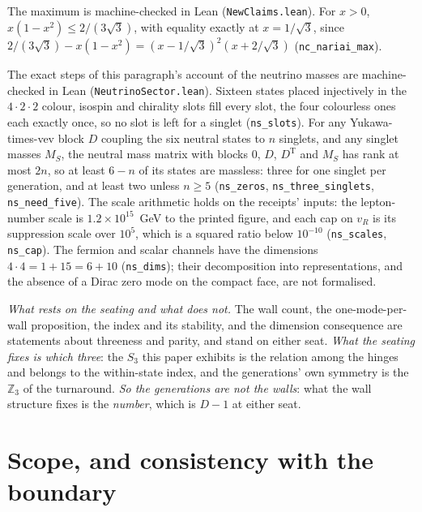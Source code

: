 \documentclass[11pt]{article}
\begin{document}
The maximum is machine-checked in Lean (\texttt{NewClaims.lean}). For $x>0$, $x(1-x^{2})\le2/(3\sqrt3)$, with equality exactly at $x=1/\sqrt3$, since $2/(3\sqrt3)-x(1-x^{2})=(x-1/\sqrt3)^{2}(x+2/\sqrt3)$ (\texttt{nc\_nariai\_max}).

The exact steps of this paragraph's account of the neutrino masses are machine-checked in Lean (\texttt{NeutrinoSector.lean}). Sixteen states placed injectively in the $4\cdot2\cdot2$ colour, isospin and chirality slots fill every slot, the four colourless ones each exactly once, so no slot is left for a singlet (\texttt{ns\_slots}). For any Yukawa-times-vev block $D$ coupling the six neutral states to $n$ singlets, and any singlet masses $M_S$, the neutral mass matrix with blocks $0$, $D$, $D^{\mathrm{T}}$ and $M_S$ has rank at most $2n$, so at least $6-n$ of its states are massless: three for one singlet per generation, and at least two unless $n\ge5$ (\texttt{ns\_zeros}, \texttt{ns\_three\_singlets}, \texttt{ns\_need\_five}). The scale arithmetic holds on the receipts' inputs: the lepton-number scale is $1.2\times10^{15}$~GeV to the printed figure, and each cap on $v_R$ is its suppression scale over $10^{5}$, which is a squared ratio below $10^{-10}$ (\texttt{ns\_scales}, \texttt{ns\_cap}). The fermion and scalar channels have the dimensions $4\cdot4=1+15=6+10$ (\texttt{ns\_dims}); their decomposition into representations, and the absence of a Dirac zero mode on the compact face, are not formalised.

\emph{What rests on the seating and what does not.} The wall count, the one-mode-per-wall
proposition, the index and its stability, and the dimension consequence are statements about
threeness and parity, and stand on either seat. \emph{What the seating fixes is which three}: the
$S_{3}$ this paper exhibits is the relation among the hinges and belongs to the within-state index, and the
generations' own symmetry is the $\mathbb{Z}_{3}$ of the turnaround. \emph{So the generations are not the walls}: what the
wall structure fixes is the \emph{number}, which is $D-1$ at either seat.

\section{Scope, and consistency with the boundary}\label{sec:scope}
\end{document}
